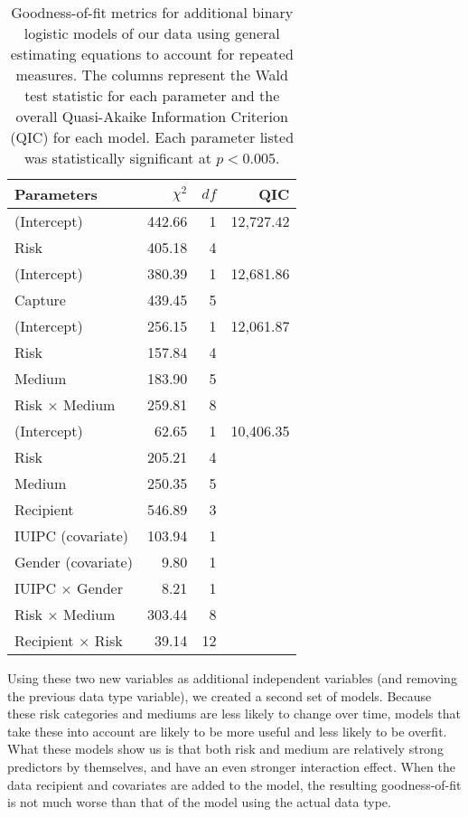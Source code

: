 \begin{table}[t]
\centering
\begin{tabular}{|l| r| r| r|}
\hline
Parameters & $\chi^2$ & $df$ & QIC\\
\hline
\hline
(Intercept) & 442.66 & 1 & 12,727.42\\
Risk & 405.18 & 4 & \\
\hline
(Intercept) & 380.39 & 1 & 12,681.86\\
Capture & 439.45 & 5 & \\
\hline
(Intercept) & 256.15 & 1 & 12,061.87\\
Risk & 157.84 & 4 & \\
Medium & 183.90 & 5 & \\
Risk $\times$ Medium & 259.81 & 8 & \\
\hline
(Intercept) & 62.65 & 1 & 10,406.35\\
Risk & 205.21 & 4 & \\
Medium & 250.35 & 5 & \\
Recipient & 546.89 & 3 & \\
IUIPC (covariate) & 103.94 & 1 & \\
Gender (covariate) & 9.80 & 1 & \\
IUIPC $\times$ Gender & 8.21 & 1 & \\
Risk $\times$ Medium & 303.44 & 8 & \\
Recipient $\times$ Risk & 39.14 & 12 & \\
\hline
\end{tabular}
\caption{Goodness-of-fit metrics for additional binary logistic models of our data using general estimating equations to account for repeated measures. The columns represent the Wald test statistic for each parameter and the overall Quasi-Akaike Information Criterion (QIC) for each model. Each parameter listed was statistically significant at $p<0.005$.}
\label{regression2}
\end{table}


Using these two new variables as additional independent variables (and removing the previous data type variable), we created a second set of models. Because these risk categories and mediums are less likely to change over time, models that take these into account are likely to be more useful and less likely to be overfit. What these models show us is that both risk and medium are relatively strong predictors by themselves, and have an even stronger interaction effect. When the data recipient and covariates are added to the model, the resulting goodness-of-fit is not much worse than that of the model using the actual data type.

